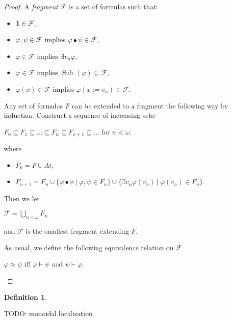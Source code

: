 \documentclass[8pt]{article}
\theoremstyle{definition}
\newtheorem{definition}{Definition}[section]
\theoremstyle{definition}
\theoremstyle{definition}
\theoremstyle{definition}
\theoremstyle{definition}
\theoremstyle{definition}
\theoremstyle{definition}
\theoremstyle{definition}
\theoremstyle{definition}
\theoremstyle{definition}
\theoremstyle{definition}
\theoremstyle{definition}
\theoremstyle{definition}
\theoremstyle{question}
\begin{document}
\begin{proof}
  A \emph{fragment} $\mathcal{F}$ is a set of formulas such that:
  \begin{itemize}
    \item ${\bf 1} \in \mathcal{F}$,
    \item $\varphi, \psi \in \mathcal{F}$ implies $\varphi \bullet \psi \in \mathcal{F}$,
    \item $\varphi \in \mathcal{F}$ implies $\exists v_n \varphi$,
    \item $\varphi \in \mathcal{F}$ implies $\operatorname{Sub}(\varphi) \subseteq \mathcal{F}$,
    \item $\varphi(x) \in \mathcal{F}$ implies $\varphi(x := v_n) \in \mathcal{F}$.
  \end{itemize}

  Any set of formulas $F$ can be extended to a fragment the following way by induction. Construct a sequence of increasing sets:
  \begin{center}
    $F_0 \subseteq F_1 \subseteq \ldots \subseteq F_n \subseteq F_{n + 1} \subseteq \dots$ for $n < \omega$.
  \end{center}
  where
  \begin{itemize}
    \item $F_0 = F \cup At$,
    \item $F_{n + 1} = F_n \cup \{ \varphi \bullet \psi \: | \: \varphi, \psi \in F_n \} \cup \{ \exists v_n \varphi(v_n) \: | \: \varphi(v_n) \in F_n \}$.
  \end{itemize}
  Then we let 
  \begin{center}
  $\mathcal{F} = \bigcup \limits_{n < \omega} F_n$
  \end{center}
  and $\mathcal{F}$ is the smallest fragment extending $F$.

  As usual, we define the following equivalence relation on $\mathcal{F}$
  \begin{center}
    $\varphi \approx \psi$ iff $\varphi \vdash \psi$ and $\psi \vdash \varphi$.
  \end{center}
\end{proof}

\begin{definition}
\end{definition}

TODO: monoidal localisation



\end{document}
